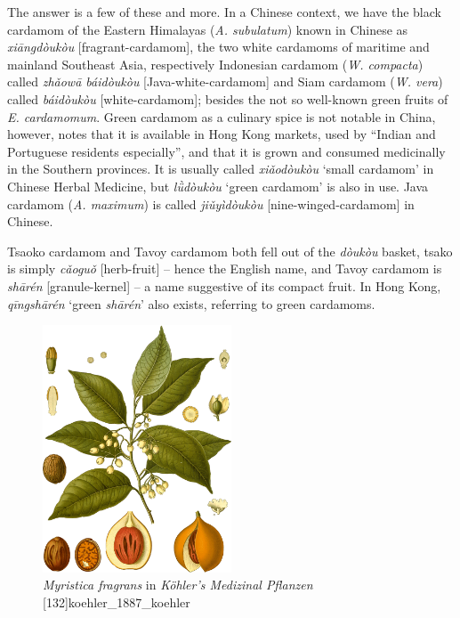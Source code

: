 \documentclass[12pt]{article}
\newcommand{\tc}[1]{\traditionalchinesefont{#1}\rmfamily}
\begin{document}

The answer is a few of these and more. In a Chinese context, we have the black cardamom of the Eastern Himalayas (\textit{A. subulatum}) known in Chinese as \textit{xiāngdòukòu} [fragrant-cardamom], the two white cardamoms of maritime and mainland Southeast Asia, respectively Indonesian cardamom (\textit{W. compacta}) called \textit{zhǎowā
báidòukòu} [Java-white-cardamom] and Siam cardamom (\textit{W. vera}) called \textit{báidòukòu} [white-cardamom]; besides the not so well-known green fruits of \textit{E. cardamomum}. Green cardamom as a culinary spice is not notable in China, however, \textcite{hu_2005_food} notes that it is available in Hong Kong markets, used by ``Indian and Portuguese residents especially'', and that it is grown and consumed medicinally in the Southern provinces. It is usually called \textit{xiǎodòukòu} `small cardamom' in Chinese Herbal Medicine, but \textit{lǜdòukòu} `green cardamom' is also in use. Java cardamom (\textit{A. maximum}) is called \textit{jiǔyìdòukòu} [nine-winged-cardamom] in Chinese. 

Tsaoko cardamom and Tavoy cardamom both fell out of the \textit{dòukòu} basket, tsako is simply \textit{cǎoguǒ} [herb-fruit] -- hence the English name, and Tavoy cardamom is \textit{shārén} [granule-kernel] -- a name suggestive of its compact fruit. In Hong Kong, \tc{青砂仁} \textit{qīngshārén} `green \textit{shārén}' also exists, referring to green cardamoms.




\begin{figure}
    \centering
    \includegraphics[width=0.5\textwidth]{imgs/nutmeg.png}
    \caption{\textit{Myristica fragrans} in \textit{Köhler's Medizinal Pflanzen} [132]{koehler_1887_koehler}}
    \label{fig:nutmeg}
\end{figure}
\end{document}
